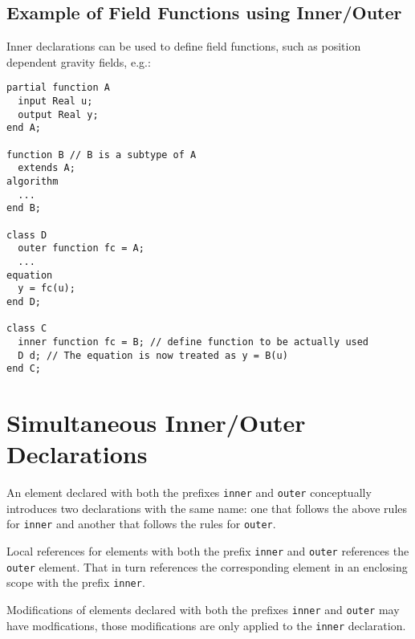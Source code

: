 \subsection{Example of Field Functions using Inner/Outer}

\begin{nonnormative}
Inner declarations can be used to define field functions, such
as position dependent gravity fields, e.g.:
\begin{lstlisting}[language=modelica]
partial function A
  input Real u;
  output Real y;
end A;

function B // B is a subtype of A
  extends A;
algorithm
  ...
end B;

class D
  outer function fc = A;
  ...
equation
  y = fc(u);
end D;

class C
  inner function fc = B; // define function to be actually used
  D d; // The equation is now treated as y = B(u)
end C;
\end{lstlisting}
\end{nonnormative}

\section{Simultaneous Inner/Outer Declarations}

An element declared with both the prefixes \lstinline!inner! and \lstinline!outer! conceptually
introduces two declarations with the same name: one that follows the
above rules for \lstinline!inner! and another that follows the rules for \lstinline!outer!.

\begin{nonnormative}
Local references for elements with both the prefix \lstinline!inner! and \lstinline!outer! references the \lstinline!outer! element.  That in turn references the corresponding
element in an enclosing scope with the prefix \lstinline!inner!.
\end{nonnormative}

Modifications of elements declared with both the prefixes \lstinline!inner! and \lstinline!outer!
may have modfications, those modifications are only applied to the
\lstinline!inner! declaration.

